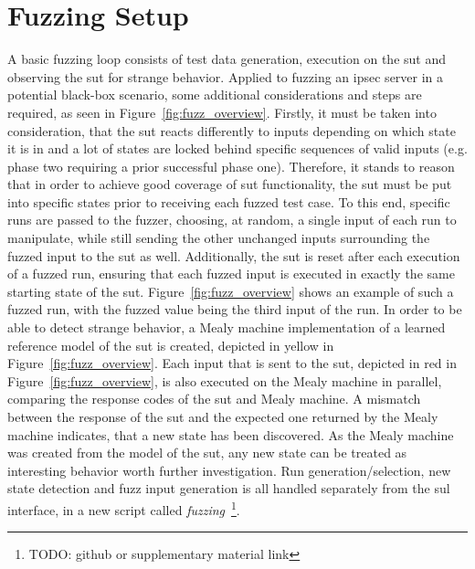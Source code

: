 \section{Fuzzing Setup} \label{sec:fuzz_intro}
A basic fuzzing loop consists of test data generation, execution on the \ac{sut} and observing the \ac{sut} for strange behavior. Applied to fuzzing an \ac{ipsec} server in a potential black-box scenario, some additional considerations and steps are required, as seen in Figure~\ref{fig:fuzz_overview}. Firstly, it must be taken into consideration, that the \ac{sut} reacts differently to inputs depending on which state it is in and a lot of states are locked behind specific sequences of valid inputs (e.g. phase two requiring a prior successful phase one). Therefore, it stands to reason that in order to achieve good coverage of \ac{sut} functionality, the \ac{sut} must be put into specific states prior to receiving each fuzzed test case. To this end, specific runs are passed to the fuzzer, choosing, at random, a single input of each run to manipulate, while still sending the other unchanged inputs surrounding the fuzzed input to the \ac{sut} as well. Additionally, the \ac{sut} is reset after each execution of a fuzzed run, ensuring that each fuzzed input is executed in exactly the same starting state of the \ac{sut}. Figure~\ref{fig:fuzz_overview} shows an example of such a fuzzed run, with the fuzzed value being the third input of the run. In order to be able to detect strange behavior, a Mealy machine implementation of a learned reference model of the \ac{sut} is created, depicted in yellow in Figure~\ref{fig:fuzz_overview}. Each input that is sent to the \ac{sut}, depicted in red in Figure~\ref{fig:fuzz_overview}, is also executed on the Mealy machine in parallel, comparing the response codes of the \ac{sut} and Mealy machine. A mismatch between the response of the \ac{sut} and the expected one returned by the Mealy machine indicates, that a new state has been discovered. As the Mealy machine was created from the model of the \ac{sut}, any new state can be treated as interesting behavior worth further investigation. Run generation/selection, new state detection and fuzz input generation is all handled separately from the \ac{sul} interface, in a new script called \emph{fuzzing}~\footnote{TODO: github or supplementary material link}.

